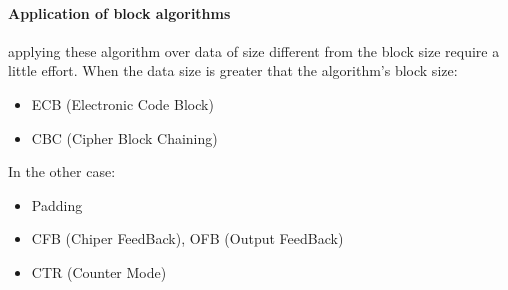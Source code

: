 \documentclass[12pt]{article}
\begin{document}
\paragraph{Application of block algorithms} applying these algorithm over data of size different from the block size require a little effort. When the data size is greater that the algorithm's block size:
\begin{itemize}
  \item ECB (Electronic Code Block)
  \item CBC (Cipher Block Chaining)
\end{itemize}
In the other case:
\begin{itemize}
  \item Padding
  \item CFB (Chiper FeedBack), OFB (Output FeedBack)
  \item CTR (Counter Mode)
\end{itemize}
\end{document}
